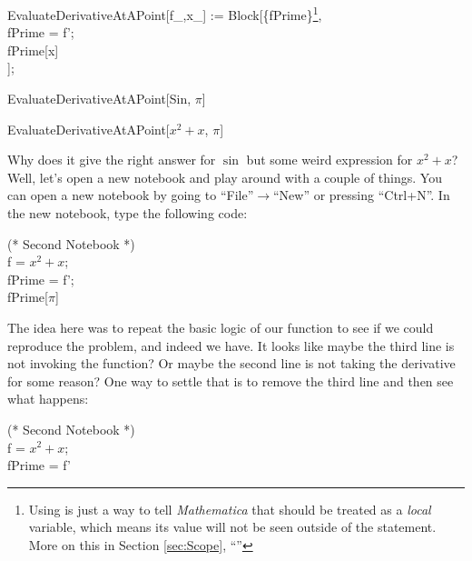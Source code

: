 \begin{code}
	   EvaluateDerivativeAtAPoint[f\_,x\_] := Block[\{fPrime\}\footnote{Using  is just a way to tell \emph{Mathematica} that  should be treated as a \emph{local} variable, which means its value will not be seen outside of the  statement. More on this in Section \ref{sec:Scope}, ``''}, \\
	   	fPrime = f';\\
		fPrime[x]\\
	   ];
\end{code}
\begin{code}
	   EvaluateDerivativeAtAPoint[Sin, $\pi$]\\
\end{code}
\begin{code}
	   \label{code:MisuseExpressionAsArgument}
	   EvaluateDerivativeAtAPoint[$x^2 + x$, $\pi$]\\
\end{code}

Why does it give the right answer for $\sin$ but some weird expression for $x^2 + x$? Well, let's open a new notebook and play around with a couple of things. You can open a new notebook by going to ``File''$\rightarrow$``New'' or pressing ``Ctrl+N''. In the new notebook, type the following code:

\begin{code}
	   (* Second Notebook *)\\
	   f = $x^2 + x$;\\
	   fPrime = f';\\
	   fPrime[$\pi$]\\
\end{code}

The idea here was to repeat the basic logic of our  function to see if we could reproduce the problem, and indeed we have. It looks like maybe the third line is not invoking the function? Or maybe the second line is not taking the derivative for some reason? One way to settle that is to remove the third line and then see what happens:

\begin{code}
	   (* Second Notebook *)\\
	   f = $x^2 + x$;\\
	   fPrime = f'\\
\end{code}

